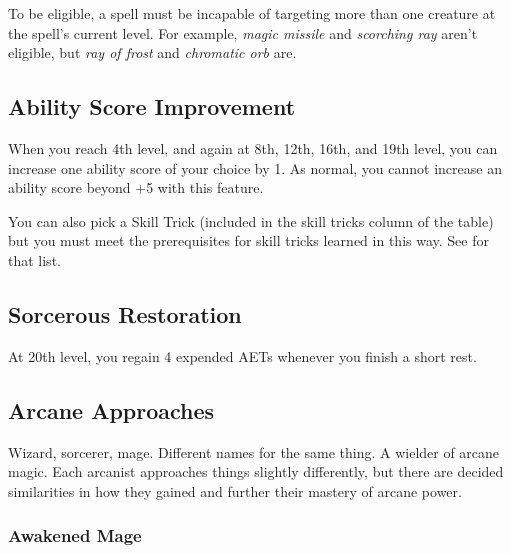 To be eligible, a spell must be incapable of targeting more than one creature at the spell's current level. For example, \textit{magic missile} and \textit{scorching ray} aren't eligible, but \textit{ray of frost} and \textit{chromatic orb} are.

\subsection{Ability Score Improvement}

When you reach 4th level, and again at 8th, 12th, 16th, and 19th level, you can increase one ability score of your choice by 1. As normal, you cannot increase an ability score beyond +5 with this feature.

You can also pick a Skill Trick (included in the skill tricks column of the  table) but you must meet the prerequisites for skill tricks learned in this way. See  for that list.

\subsection{Sorcerous Restoration}

At 20th level, you regain 4 expended AETs whenever you finish a short rest.

\subsection{Arcane Approaches}

Wizard, sorcerer, mage. Different names for the same thing. A wielder of arcane magic. Each arcanist approaches things slightly differently, but there are decided similarities in how they gained and further their mastery of arcane power.

\subsubsection{Awakened Mage}
